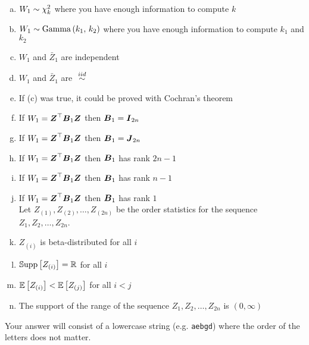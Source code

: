 \documentclass[12pt,landscape]{article}
\newcommand{\instr}{\small Your answer will consist of a lowercase string (e.g. \texttt{aebgd}) where the order of the letters does not matter. \normalsize}
\begin{document}
\vspace{-0.2cm}\benum{} 

\begin{enumerate}[(a)]

\item $W_1 \sim \chi^2_{k}$ where you have enough information to compute $k$
\item $W_1 \sim \mathrm{Gamma}\left(k_1,\,k_2\right)$ where you have enough information to compute $k_1$ and $k_2$
\item $W_1$ and $\bar{Z}_1$ are independent
\item $W_1$ and $\bar{Z}_1$ are $\iid$
\item If (c) was true, it could be proved with Cochran's theorem
\item If $W_1 = \boldsymbol{Z}^\top\boldsymbol{B}_1\boldsymbol{Z}$ then $\boldsymbol{B}_1 = \boldsymbol{I}_{2n}$
\item If $W_1 = \boldsymbol{Z}^\top\boldsymbol{B}_1\boldsymbol{Z}$ then $\boldsymbol{B}_1 = \boldsymbol{J}_{2n}$
\item If $W_1 = \boldsymbol{Z}^\top\boldsymbol{B}_1\boldsymbol{Z}$ then $\boldsymbol{B}_1$ has rank $2n-1$
\item If $W_1 = \boldsymbol{Z}^\top\boldsymbol{B}_1\boldsymbol{Z}$ then $\boldsymbol{B}_1$ has rank $n-1$
\item If $W_1 = \boldsymbol{Z}^\top\boldsymbol{B}_1\boldsymbol{Z}$ then $\boldsymbol{B}_1$ has rank $1$ \\

Let $Z_{(1)}, Z_{(2)}, \ldots, Z_{(2n)}$ be the order statistics for the sequence $Z_1, Z_2, \ldots, Z_{2n}$.

\item $Z_{(i)}$ is beta-distributed for all $i$
\item $\mathbb{S}\text{upp}\left[Z_{(i)}\right] = \mathbb{R}$ for all $i$
\item $\mathbb{E}\left[Z_{(i)}\right] < \mathbb{E}\left[Z_{(j)}\right]$ for all $i < j$
\item The support of the range of the sequence $Z_1, Z_2, \ldots, Z_{2n}$ is $(0, \infty)$
\end{enumerate}
\eenum\instr\pagebreak
\end{document}
